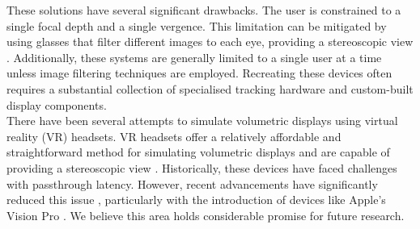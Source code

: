 These solutions have several significant drawbacks. The user is constrained to a single focal depth and a single vergence. This limitation can be mitigated by using glasses that filter different images to each eye, providing a stereoscopic view \cite{5701756}. Additionally, these systems are generally limited to a single user at a time unless image filtering techniques are employed. Recreating these devices often requires a substantial collection of specialised tracking hardware and custom-built display components. \\

There have been several attempts to simulate volumetric displays using virtual reality (VR) headsets. VR headsets offer a relatively affordable and straightforward method for simulating volumetric displays and are capable of providing a stereoscopic view \cite{10.1145/3290605.3300763}. Historically, these devices have faced challenges with passthrough latency. However, recent advancements have significantly reduced this issue \cite{10.1145/3290605.3300763}, particularly with the introduction of devices like Apple's Vision Pro \cite{noauthor_apple_vision_nodate}. We believe this area holds considerable promise for future research. \\


